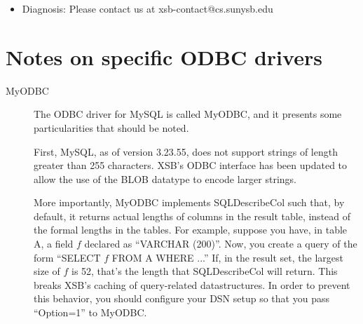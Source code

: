\begin{description}
\begin{itemize}
\item Diagnosis: Please contact us at xsb-contact@cs.sunysb.edu
\end{itemize}

\section{Notes on specific ODBC drivers}

\begin{description}
\item[MyODBC] The ODBC driver for MySQL is called MyODBC, and it
  presents some particularities that should be noted. 

  First, MySQL, as
  of version 3.23.55, does not support strings of length greater than
  255 characters. XSB's ODBC interface has been updated to allow the
  use of the BLOB datatype to encode larger strings. 
  
  More importantly, MyODBC implements SQLDescribeCol such that, by
  default, it returns actual lengths of columns in the result table,
  instead of the formal lengths in the tables. For example, suppose
  you have, in table A, a field $f$ declared as ``VARCHAR
  (200)''. Now, you create a query of the form ``SELECT $f$ FROM A
  WHERE ...'' If, in the result set, the largest size of $f$ is 52,
  that's the length that SQLDescribeCol will return. This breaks XSB's
  caching of query-related datastructures. In order to prevent this
  behavior, you should configure your DSN setup so that you pass
  ``Option=1'' to MyODBC.

\end{description}


\end{description}

